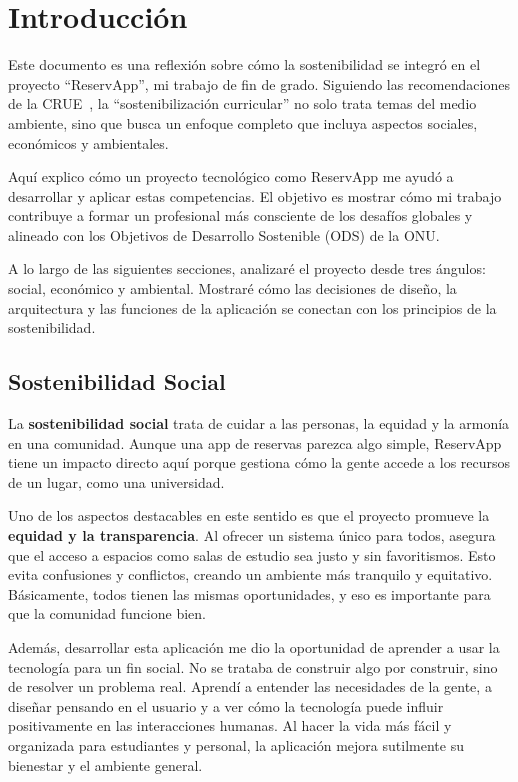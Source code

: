 
\section{Introducción}
Este documento es una reflexión sobre cómo la sostenibilidad se integró en el proyecto ``ReservApp'', mi trabajo de fin de grado. Siguiendo las recomendaciones de la CRUE~\cite{crue}, la ``sostenibilización curricular'' no solo trata temas del medio ambiente, sino que busca un enfoque completo que incluya aspectos sociales, económicos y ambientales.

Aquí explico cómo un proyecto tecnológico como ReservApp me ayudó a desarrollar y aplicar estas competencias. El objetivo es mostrar cómo mi trabajo contribuye a formar un profesional más consciente de los desafíos globales y alineado con los Objetivos de Desarrollo Sostenible (ODS) de la ONU.

A lo largo de las siguientes secciones, analizaré el proyecto desde tres ángulos: social, económico y ambiental. Mostraré cómo las decisiones de diseño, la arquitectura y las funciones de la aplicación se conectan con los principios de la sostenibilidad.

\subsection{Sostenibilidad Social}
La \textbf{sostenibilidad social} trata de cuidar a las personas, la equidad y la armonía en una comunidad. Aunque una app de reservas parezca algo simple, ReservApp tiene un impacto directo aquí porque gestiona cómo la gente accede a los recursos de un lugar, como una universidad.

Uno de los aspectos destacables en este sentido es que el proyecto promueve la \textbf{equidad y la transparencia}. Al ofrecer un sistema único para todos, asegura que el acceso a espacios como salas de estudio sea justo y sin favoritismos. Esto evita confusiones y conflictos, creando un ambiente más tranquilo y equitativo. Básicamente, todos tienen las mismas oportunidades, y eso es importante para que la comunidad funcione bien.

Además, desarrollar esta aplicación me dio la oportunidad de aprender a usar la tecnología para un fin social. No se trataba de construir algo por construir, sino de resolver un problema real. Aprendí a entender las necesidades de la gente, a diseñar pensando en el usuario y a ver cómo la tecnología puede influir positivamente en las interacciones humanas. Al hacer la vida más fácil y organizada para estudiantes y personal, la aplicación mejora sutilmente su bienestar y el ambiente general.

